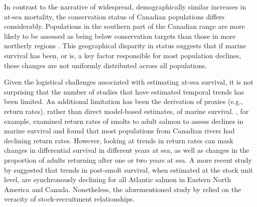 \documentclass[12pt]{article}
\begin{document}
In contrast to the narrative of widespread, demographically similar increases
in at-sea mortality, the conservation status of Canadian populations differs
considerably. Populations in the southern part of the Canadian range are more
likely to be assessed as being below conservation targets than those in more
northerly regions \citep{Cosewic2010}. This geographical disparity in status
suggests that if marine survival has been, or is, a key factor responsible for
most population declines, these changes are not uniformly distributed across
all populations.  



Given the logistical challenges associated with estimating at-sea survival, it
is not surprising that the number of studies that have estimated temporal
trends has been limited. An additional limitation has been the derivation of
proxies (e.g., return rates), rather than direct model-based estimates, of
marine survival.
\citet{Chaput2012a}, for example, examined return rates of smolts to adult salmon to assess
declines in marine survival and found that most populations from Canadian
rivers had declining return rates. 
However, looking at trends in return rates
can mask changes in differential survival in different years at sea, as well
as changes in the proportion of adults returning after one or two years at sea.
A more recent study by \citet{Olmos2019} suggested that trends in post-smolt
survival, when estimated at the stock unit level, are synchronously declining
for all Atlantic salmon in Eastern North America and Canada. Nonetheless,
the aforementioned study by \citet{Olmos2019} relied on the veracity of stock-recruitment relationships.
\end{document}
